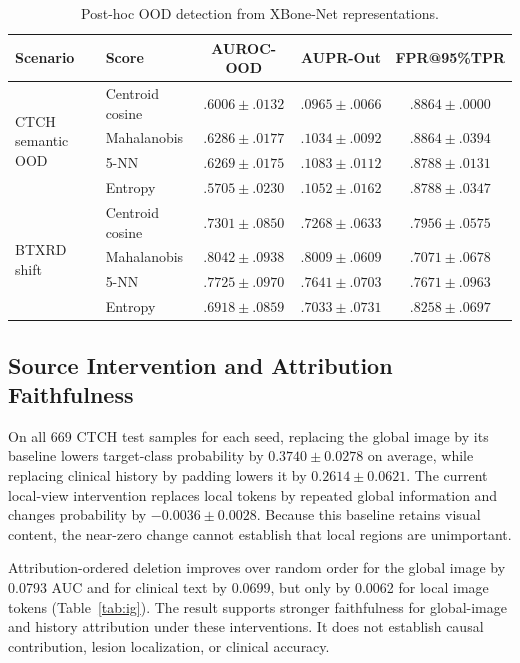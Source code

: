 \documentclass[runningheads]{llncs}
\begin{document}
\begin{table}[t]
\caption{Post-hoc OOD detection from XBone-Net representations.}
\label{tab:ood}
\centering
\scriptsize
\begin{tabular}{llccc}
\toprule
Scenario & Score & AUROC-OOD & AUPR-Out & FPR@95\%TPR \\
\midrule
\multirow{4}{*}{CTCH semantic OOD}
& Centroid cosine & $.6006\pm.0132$ & $.0965\pm.0066$ & $.8864\pm.0000$ \\
& Mahalanobis & \textbf{$.6286\pm.0177$} & $.1034\pm.0092$ & $.8864\pm.0394$ \\
& 5-NN & $.6269\pm.0175$ & \textbf{$.1083\pm.0112$} & \textbf{$.8788\pm.0131$} \\
& Entropy & $.5705\pm.0230$ & $.1052\pm.0162$ & $.8788\pm.0347$ \\
\midrule
\multirow{4}{*}{BTXRD shift}
& Centroid cosine & $.7301\pm.0850$ & $.7268\pm.0633$ & $.7956\pm.0575$ \\
& Mahalanobis & \textbf{$.8042\pm.0938$} & \textbf{$.8009\pm.0609$} & \textbf{$.7071\pm.0678$} \\
& 5-NN & $.7725\pm.0970$ & $.7641\pm.0703$ & $.7671\pm.0963$ \\
& Entropy & $.6918\pm.0859$ & $.7033\pm.0731$ & $.8258\pm.0697$ \\
\bottomrule
\end{tabular}
\end{table}

\subsection{Source Intervention and Attribution Faithfulness}

On all 669 CTCH test samples for each seed, replacing the global image by its baseline lowers target-class probability by $0.3740\pm0.0278$ on average, while replacing clinical history by padding lowers it by $0.2614\pm0.0621$. The current local-view intervention replaces local tokens by repeated global information and changes probability by $-0.0036\pm0.0028$. Because this baseline retains visual content, the near-zero change cannot establish that local regions are unimportant.

Attribution-ordered deletion improves over random order for the global image by 0.0793 AUC and for clinical text by 0.0699, but only by 0.0062 for local image tokens (Table~\ref{tab:ig}). The result supports stronger faithfulness for global-image and history attribution under these interventions. It does not establish causal contribution, lesion localization, or clinical accuracy.
\end{document}
